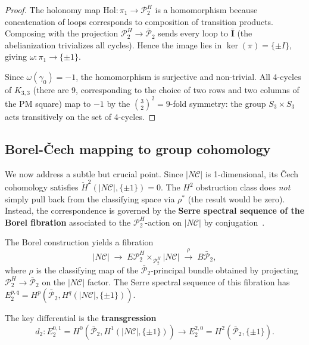 \documentclass[11pt]{article}
\begin{document}
\begin{proof}
The holonomy map $\mathrm{Hol}: \pi_1 \to \mathcal{P}_2^H$ is a homomorphism because
concatenation of loops corresponds to composition of transition products. Composing
with the projection $\mathcal{P}_2^H \to \bar{\mathcal{P}}_2$ sends every loop
to $\bar{\mathbf{I}}$ (the abelianization trivializes all cycles). Hence the image
lies in $\ker(\pi) = \{\pm I\}$, giving $\omega: \pi_1 \to \{\pm 1\}$.

Since $\omega(\gamma_0) = -1$, the homomorphism is surjective and non-trivial.
All 4-cycles of $K_{3,3}$ (there are 9, corresponding to the choice of two rows
and two columns of the PM square) map to $-1$ by the $\binom{3}{2}^2 = 9$-fold
symmetry: the group $S_3 \times S_3$ acts transitively on the set of 4-cycles.
\end{proof}

\subsection{Borel-\v{C}ech mapping to group cohomology}
\label{sec:borel}

We now address a subtle but crucial point. Since $|N\mathcal{C}|$ is 1-dimensional,
its \v{C}ech cohomology satisfies $\check{H}^2(|N\mathcal{C}|, \{\pm 1\}) = 0$.
The $H^2$ obstruction class does \emph{not} simply pull back from the classifying
space via $\rho^*$ (the result would be zero). Instead, the correspondence
is governed by the \textbf{Serre spectral sequence of the Borel fibration}
associated to the $\mathcal{P}_2^H$-action on $|N\mathcal{C}|$ by conjugation~\cite{Brown82}.

The Borel construction yields a fibration
\[
|N\mathcal{C}| \;\longrightarrow\;
E\mathcal{P}_2^H \times_{\mathcal{P}_2^H} |N\mathcal{C}|
\;\xrightarrow{\;\rho\;}\; B\bar{\mathcal{P}}_2,
\]
where $\rho$ is the classifying map of the $\bar{\mathcal{P}}_2$-principal
bundle obtained by projecting $\mathcal{P}_2^H \to \bar{\mathcal{P}}_2$
on the $|N\mathcal{C}|$ factor. The Serre spectral sequence of this
fibration has $E_2^{p,q} = H^p(\bar{\mathcal{P}}_2, H^q(|N\mathcal{C}|, \{\pm 1\}))$.

The key differential is the \textbf{transgression}
\[
d_2: E_2^{0,1} = H^0(\bar{\mathcal{P}}_2, H^1(|N\mathcal{C}|, \{\pm 1\}))
\longrightarrow E_2^{2,0} = H^2(\bar{\mathcal{P}}_2, \{\pm 1\}).
\]
\end{document}
